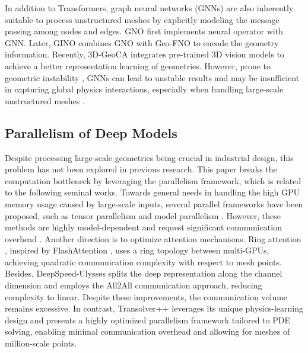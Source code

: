In addition to Transformers, graph neural networks (GNNs) \cite{hamilton2017inductive,gao2019graph, pfaff2021learning} are also inherently suitable to process unstructured meshes by explicitly modeling the message passing among nodes and edges. GNO \cite{Li2020NeuralOG} first implements neural operator with GNN.
Later, GINO \cite{li2023geometryinformed} combines GNO with Geo-FNO to encode the geometry information. Recently, 3D-GeoCA \cite{anonymous2023geometryguided} integrates pre-trained 3D vision models to achieve a better representation learning of geometries. However, prone to geometric instability \cite{instabilityGNN}, GNNs can lead to unstable results and may be insufficient in capturing global physics interactions, especially when handling large-scale unstructured meshes \cite{morris2023geometric}.

\subsection{Parallelism of Deep Models} 
Despite processing large-scale geometries being crucial in industrial design, this problem has not been explored in previous research. This paper breaks the computation bottleneck by leveraging the parallelism framework, which is related to the following seminal works. Towards general needs in handling the high GPU memory usage caused by large-scale inputs, several parallel frameworks have been proposed, such as tensor parallelism \cite{shoeybi2019megatron} and model parallelism \cite{huang2019gpipe}. However, these methods are highly model-dependent and request significant communication overhead \cite{zhuang2023optimizing}. Another direction is to optimize attention mechanisms. Ring attention \cite{liu2023ring}, inspired by FlashAttention \cite{dao2022flashattention}, uses a ring topology between multi-GPUs, achieving quadratic communication complexity with respect to mesh points. Besides, DeepSpeed-Ulysses \cite{jacobs2023deepspeed} splits the deep representation along the channel dimension and employs the All2All communication approach, reducing complexity to linear. Despite these improvements, the communication volume remains excessive. In contrast, Transolver++ leverages its unique physics-learning design and presents a highly optimized parallelism framework tailored to PDE solving, enabling minimal communication overhead and allowing for meshes of million-scale points.